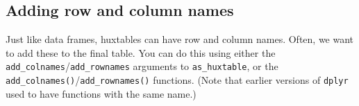 \documentclass[]{article}
\newenvironment{Shaded}{\begin{snugshade}}{\end{snugshade}}
\newcommand{\KeywordTok}[1]{\textcolor[rgb]{0.13,0.29,0.53}{\textbf{#1}}}
\newcommand{\DataTypeTok}[1]{\textcolor[rgb]{0.13,0.29,0.53}{#1}}
\newcommand{\DecValTok}[1]{\textcolor[rgb]{0.00,0.00,0.81}{#1}}
\newcommand{\StringTok}[1]{\textcolor[rgb]{0.31,0.60,0.02}{#1}}
\newcommand{\OperatorTok}[1]{\textcolor[rgb]{0.81,0.36,0.00}{\textbf{#1}}}
\newcommand{\NormalTok}[1]{#1}
\begin{document}
\FloatBarrier

\subsection{Adding row and column
names}\label{adding-row-and-column-names}

Just like data frames, huxtables can have row and column names. Often,
we want to add these to the final table. You can do this using either
the \texttt{add\_colnames}/\texttt{add\_rownames} arguments to
\texttt{as\_huxtable}, or the
\texttt{add\_colnames()}/\texttt{add\_rownames()} functions. (Note that
earlier versions of \texttt{dplyr} used to have functions with the same
name.)

\begin{Shaded}
\end{Shaded}
\end{document}

